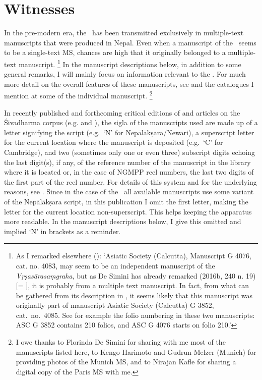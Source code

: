 \section{Witnesses}
\frenchspacing

\noindent
In the pre-modern era, the \VSS\ has been transmitted exclusively in multiple-text manuscripts that were produced in Nepal. Even when a
manuscript of the \VSS\ seems to be a single-text MS, 
chances are high that it originally belonged to a multiple-text
manuscript.%
	\footnote{\label{noteonKolkataMs}As I remarked elsewhere 
	():
	`Asiatic Society (Calcutta), Manuscript G 4076, cat. no. 4083, 
	may seem to be an independent manuscript of the 
	\textit{Vṛṣasārasaṃgraha}, but as De Simini has already 
	remarked (2016b, 240 n. 19) [= ],
	it is probably from a multiple text manuscript. In fact, from what
	can be gathered from its description in
	,
	it seems likely that this manuscript was
	originally part of manuscript Asiatic Society (Calcutta) G 3852, cat.\
	no.\ 4085. See for example the folio numbering in these two 
	manuscripts: ASC G 3852 contains 210 folios, 
	and ASC G 4076 starts on folio 210.'}
In the manuscript descriptions below, in addition to some general
remarks, I will mainly focus on information relevant to the \VSS. For
much more detail on the overall features of these manuscripts, see 
\mycite{DeSiminiMSSFromNepal2016} and the catalogues I mention
at some of the individual manuscript.%
		\footnote{I owe thanks to Florinda De Simini for 
			sharing with me most of the manuscripts listed here, to
  			Kengo Harimoto and Gudrun Melzer (Munich) for 
  			providing photos of the  Munich MS, and to 
  			Nirajan Kafle for sharing a digital 
  			copy of the Paris MS with me.}

In recently published and forthcoming critical editions of and articles
on the Śivadharma corpus 
(e.g.  and 
), 
the sigla of the manuscripts used are made up of 
a letter signifying the script (e.g.~`N' for
Nepālākṣara/Newari), a superscript letter for the current location where
the manuscript is deposited (e.g.~`C' for Cambridge), and two (sometimes only one or even three) subscript digits echoing the last digit(s), if any, of the reference number of the manuscript in the 
library where it is located or, in the case of NGMPP reel 
numbers, the last two digits of the first part of the reel number. 
For details of this system and for the underlying reasons, see 
. 
Since in the case of the \VSS\ all available 
manuscripts use some variant of the Nepālākṣara script, 
in this publication I omit the first letter, making the letter for the current 
location non-superscript. This helps keeping the apparatus 
more readable. In the manuscript descriptions below, I give this 
omitted and implied `N' in brackets as a reminder.


